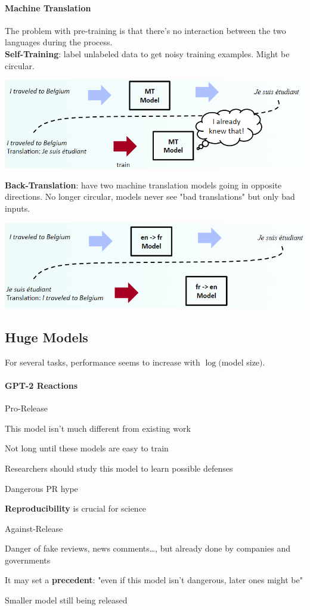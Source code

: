 \documentclass[10pt]{report}
\begin{document}
\paragraph{Machine Translation} The problem with pre-training is that there's no interaction between the two languages during the process.\\
\textbf{Self-Training}: label unlabeled data to get noisy training examples. Might be circular.
\begin{center}
	\includegraphics[scale=0.5]{144.png}
\end{center}
\textbf{Back-Translation}: have two machine translation models going in opposite directions. No longer circular, models never see "bad translations" but only bad inputs.
\begin{center}
	\includegraphics[scale=0.5]{145.png}
\end{center}
\subsection{Huge Models} For several tasks, performance seems to increase with $\log($model size$)$.
\paragraph{GPT-2 Reactions} 
\begin{multicols}{2}
Pro-Release \begin{list}{}{}
	\item This model isn't much different from existing work
	\item Not long until these models are easy to train
	\item Researchers should study this model to learn possible defenses
	\item Dangerous PR hype
	\item \textbf{Reproducibility} is crucial for science
\end{list}
\columnbreak
Against-Release \begin{list}{}{}
	\item Danger of fake reviews, news comments\ldots, but already done by companies and governments
	\item It may set a \textbf{precedent}: "even if this model isn't dangerous, later ones might be"
	\item Smaller model still being released
\end{list}
\end{multicols}
\end{document}
